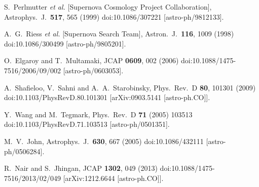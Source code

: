 \documentclass[nofootinbib,twocolumn]{revtex4}
\begin{document}
\begin{thebibliography}{99}



  S.~Perlmutter {\it et al.} [Supernova Cosmology Project Collaboration],
  Astrophys.\ J.\  {\bf 517}, 565 (1999)
  doi:10.1086/307221
  [astro-ph/9812133].
  
  A.~G.~Riess {\it et al.} [Supernova Search Team],
  Astron.\ J.\  {\bf 116}, 1009 (1998)
  doi:10.1086/300499
  [astro-ph/9805201].
  
  
  O.~Elgaroy and T.~Multamaki,
  JCAP {\bf 0609}, 002 (2006)
  doi:10.1088/1475-7516/2006/09/002
  [astro-ph/0603053].
  
  A.~Shafieloo, V.~Sahni and A.~A.~Starobinsky,
  Phys.\ Rev.\ D {\bf 80}, 101301 (2009)
  doi:10.1103/PhysRevD.80.101301
  [arXiv:0903.5141 [astro-ph.CO]].
  
  Y.~Wang and M.~Tegmark,
  Phys.\ Rev.\ D {\bf 71} (2005) 103513
  doi:10.1103/PhysRevD.71.103513
  [astro-ph/0501351].
  

  M.~V.~John,
  Astrophys.\ J.\  {\bf 630}, 667 (2005)
  doi:10.1086/432111
  [astro-ph/0506284].
  
  R.~Nair and S.~Jhingan,
  JCAP {\bf 1302}, 049 (2013)
  doi:10.1088/1475-7516/2013/02/049
  [arXiv:1212.6644 [astro-ph.CO]].


\end{thebibliography}
\end{document}
